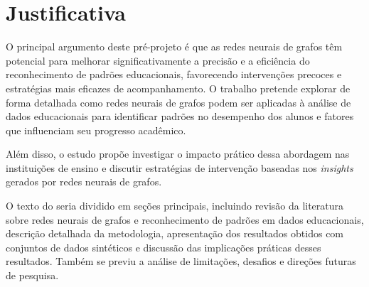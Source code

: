 \chapter{Justificativa}
\label{pre:justificativa}

O principal argumento deste pr\'e-projeto \'e que as redes neurais de grafos t\^em potencial para melhorar significativamente a precis\~ao e a efici\^encia do reconhecimento de padr\~oes educacionais, favorecendo interven\c{c}\~oes precoces e estrat\'egias mais eficazes de acompanhamento. O trabalho pretende explorar de forma detalhada como redes neurais de grafos podem ser aplicadas \`a an\'alise de dados educacionais para identificar padr\~oes no desempenho dos alunos e fatores que influenciam seu progresso acad\^emico.

Al\'em disso, o estudo prop\~oe investigar o impacto pr\'atico dessa abordagem nas institui\c{c}\~oes de ensino e discutir estrat\'egias de interven\c{c}\~ao baseadas nos \textit{insights} gerados por redes neurais de grafos.

O texto do  seria dividido em se\c{c}\~oes principais, incluindo revis\~ao da literatura sobre redes neurais de grafos e reconhecimento de padr\~oes em dados educacionais, descri\c{c}\~ao detalhada da metodologia, apresenta\c{c}\~ao dos resultados obtidos com conjuntos de dados sintéticos e discuss\~ao das implica\c{c}\~oes pr\'aticas desses resultados. Tamb\'em se previu a an\'alise de limita\c{c}\~oes, desafios e dire\c{c}\~oes futuras de pesquisa.
